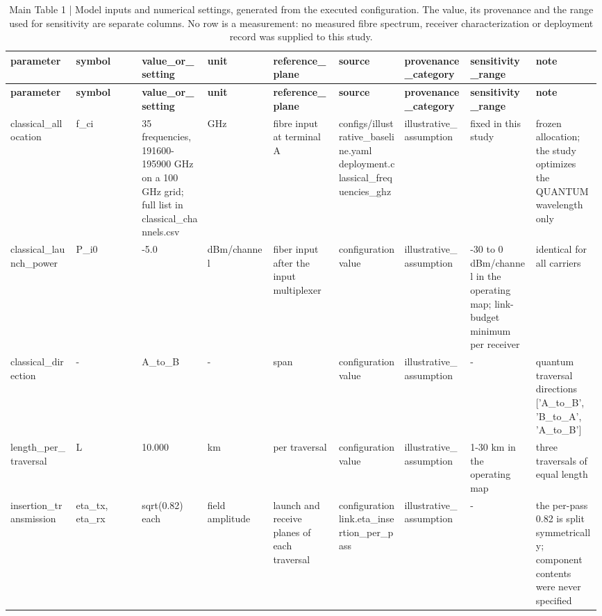 \begin{longtable}{p{0.11\linewidth}p{0.11\linewidth}p{0.11\linewidth}p{0.11\linewidth}p{0.11\linewidth}p{0.11\linewidth}p{0.11\linewidth}p{0.11\linewidth}p{0.11\linewidth}}
\caption{Main Table 1 | Model inputs and numerical settings, generated from the executed configuration. The value, its provenance and the range used for sensitivity are separate columns. No row is a measurement: no measured fibre spectrum, receiver characterization or deployment record was supplied to this study.}\label{tab:main_table1_model_inputs_and_numerical_settings}\\
\hline
\textbf{parameter} & \textbf{symbol} & \textbf{value\_or\_setting} & \textbf{unit} & \textbf{reference\_plane} & \textbf{source} & \textbf{provenance\_category} & \textbf{sensitivity\_range} & \textbf{note} \\
\hline
\endfirsthead
\hline
\textbf{parameter} & \textbf{symbol} & \textbf{value\_or\_setting} & \textbf{unit} & \textbf{reference\_plane} & \textbf{source} & \textbf{provenance\_category} & \textbf{sensitivity\_range} & \textbf{note} \\
\hline
\endhead
classical\_allocation & f\_ci & 35 frequencies, 191600-195900 GHz on a 100 GHz grid; full list in classical\_channels.csv & GHz & fibre input at terminal A & configs/illustrative\_baseline.yaml deployment.classical\_frequencies\_ghz & illustrative\_assumption & fixed in this study & frozen allocation; the study optimizes the QUANTUM wavelength only \\
classical\_launch\_power & P\_i0 & -5.0 & dBm/channel & fiber input after the input multiplexer & configuration value & illustrative\_assumption & -30 to 0 dBm/channel in the operating map; link-budget minimum per receiver & identical for all carriers \\
classical\_direction & - & A\_to\_B & - & span & configuration value & illustrative\_assumption & - & quantum traversal directions ['A\_to\_B', 'B\_to\_A', 'A\_to\_B'] \\
length\_per\_traversal & L & 10.000 & km & per traversal & configuration value & illustrative\_assumption & 1-30 km in the operating map & three traversals of equal length \\
insertion\_transmission & eta\_tx, eta\_rx & sqrt(0.82) each & field amplitude & launch and receive planes of each traversal & configuration link.eta\_insertion\_per\_pass & illustrative\_assumption & - & the per-pass 0.82 is split symmetrically; component contents were never specified \\

\end{longtable}

